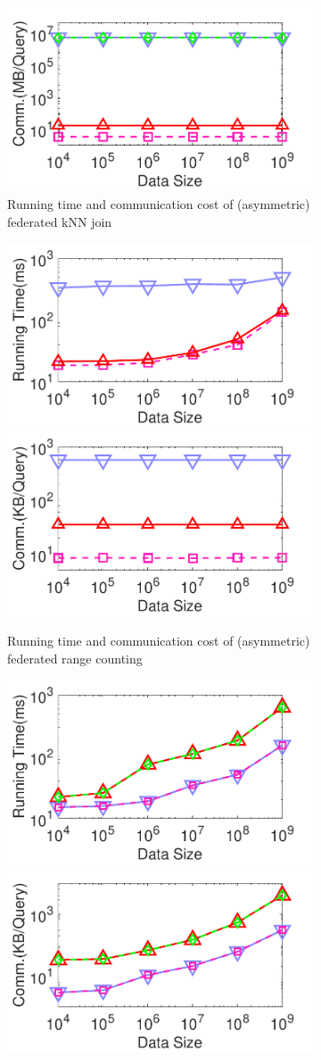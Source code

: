 \begin{figure}[t]
\begin{subfigure}{0.48\textwidth}
        \includegraphics[width=0.48\linewidth]{apdx/knnjoin_datasize_cost_revision.pdf}
        \caption{Running time and communication cost of (asymmetric) federated kNN join}
        \label{fig:knn-j-eff-size-n-cty}
    \end{subfigure}  
    \begin{subfigure}{0.48\textwidth}
        \centering
        \includegraphics[width=0.48\linewidth]{apdx/rangecount_datasize_time_revision.pdf}
        \includegraphics[width=0.48\linewidth]{apdx/rangecount_datasize_cost_revision.pdf}
        \caption{Running time and communication cost of (asymmetric) federated range counting}
        \label{fig:count-eff-size-n-cty}
    \end{subfigure}      
     \begin{subfigure}{0.48\textwidth}
        \centering
        \includegraphics[width=0.48\linewidth]{apdx/rangequery_datasize_time_revision.pdf}
        \includegraphics[width=0.48\linewidth]{apdx/rangequery_datasize_cost_revision.pdf}

\end{subfigure}
\end{figure}
